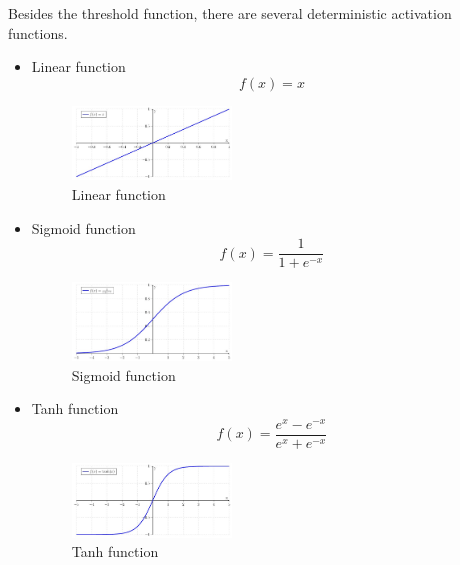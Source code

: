 Besides the threshold function, there are several deterministic activation functions.
\begin{itemize}
  \item Linear function 
\begin{equation}\label{eq:LinearFunc}
f(x) = x
\end{equation}

\graphicspath{ {./Figures/} }
\begin{figure}[!htb]
\centering
\includegraphics[width=0.4\textwidth]{Linear_function.jpeg}
\caption{\label{fig:LinearFunc}Linear function}
\end{figure}
  
  \item Sigmoid function
\begin{equation}\label{eq:SigmoidFunc}
f(x) = \frac{1}{1+e^{-x}}
\end{equation}

\graphicspath{ {./Figures/} }
\begin{figure}[!htb]
\centering
\includegraphics[width=0.4\textwidth]{Logistic-curve.jpeg}
\caption{\label{fig:SigmoidFunc}Sigmoid function}
\end{figure}

  \item Tanh function
\begin{equation}\label{eq:TanhFunc}
f(x) = \frac{e^{x}-e^{-x}}{e^{x}+e^{-x}}
\end{equation}

\graphicspath{ {./Figures/} }
\begin{figure}[!htb]
\centering
\includegraphics[width=0.4\textwidth]{tanh.jpeg}
\caption{\label{fig:TanhFunc}Tanh function}
\end{figure}
\end{itemize}


